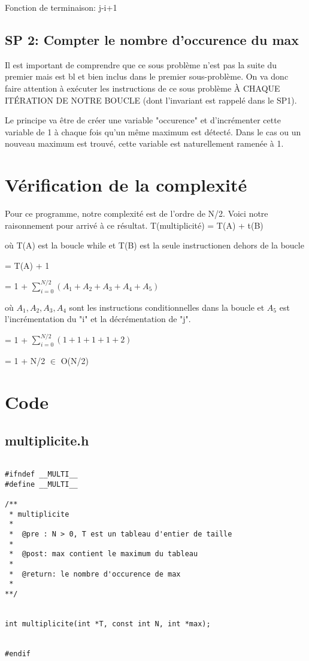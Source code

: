 \documentclass[a4paper, 11pt, oneside]{article}
\begin{document}
Fonction de terminaison: j-i+1

\subsection{SP 2: Compter le nombre d'occurence du max}

Il est important de comprendre que ce sous problème n'est pas la suite du premier mais est bl et bien inclus dans le premier sous-problème. On va donc faire attention à exécuter les instructions de ce sous problème À CHAQUE ITÉRATION DE NOTRE BOUCLE (dont l'invariant est rappelé dans  le SP1).

Le principe va être de créer une variable "occurence" et d'incrémenter cette variable de 1 à chaque fois qu'un même maximum est détecté. Dans le cas ou un nouveau maximum est trouvé, cette variable est naturellement ramenée à 1.



\section{Vérification de la complexité}

Pour ce programme, notre complexité est de l'ordre de N/2. Voici notre raisonnement pour arrivé à ce résultat.
\bigskip
T(multiplicité) = T(A) + t(B)

où T(A) est la boucle while et T(B) est la seule instructionen dehors de la boucle

= T(A) + 1

= 1 + $\sum_{i = 0}^{N/2} (A_1 + A_2 + A_3 + A_4 + A_5)$

où $A_1, A_2, A_3, A_4$ sont les instructions conditionnelles dans la boucle et $A_5$ est l'incrémentation du "i" et la décrémentation de "j".

= 1 + $\sum_{i = 0}^{N/2} (1 + 1 + 1 + 1 + 2)$

= 1 + N/2 $\in$ O(N/2)


\section{Code}
\subsection{multiplicite.h}
\begin{lstlisting}[caption={Header}]

#ifndef __MULTI__
#define __MULTI__

/**
 * multiplicite
 *
 *  @pre : N > 0, T est un tableau d'entier de taille
 *
 *  @post: max contient le maximum du tableau
 *
 *  @return: le nombre d'occurence de max
 *
**/


int multiplicite(int *T, const int N, int *max);


#endif


\end{lstlisting}
\end{document}
